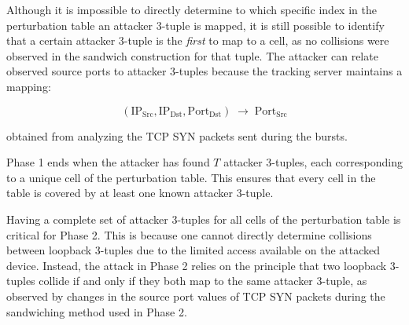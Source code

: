 \documentclass{report}
\begin{document}

Although it is impossible to directly determine to which specific index in the perturbation table an attacker 3-tuple is mapped, it is still possible to identify that a certain attacker 3-tuple is the \emph{first} to map to a cell, as no collisions were observed in the sandwich construction for that tuple. The attacker can relate observed source ports to attacker 3-tuples because the tracking server maintains a mapping:

\[
	(\mathrm{IP_{Src}}, \mathrm{IP_{Dst}}, \mathrm{Port_{Dst}}) \;\rightarrow\; \mathrm{Port_{Src}}
\]

obtained from analyzing the TCP SYN packets sent during the bursts.


Phase 1 ends when the attacker has found $T$ attacker 3-tuples, each corresponding to a unique cell of the perturbation table. This ensures that every cell in the table is covered by at least one known attacker 3-tuple.


Having a complete set of attacker 3-tuples for all cells of the perturbation table is critical for Phase 2. This is because one cannot directly determine collisions between loopback 3-tuples due to the limited access available on the attacked device. Instead, the attack in Phase 2 relies on the principle that two loopback 3-tuples collide if and only if they both map to the same attacker 3-tuple, as observed by changes in the source port values of TCP SYN packets during the sandwiching method used in Phase 2.

\begin{center}
	\begin{minipage}[t]{0.5\textwidth}
		\vspace{0cm}

		
	\end{minipage}
\end{center}
\end{document}
